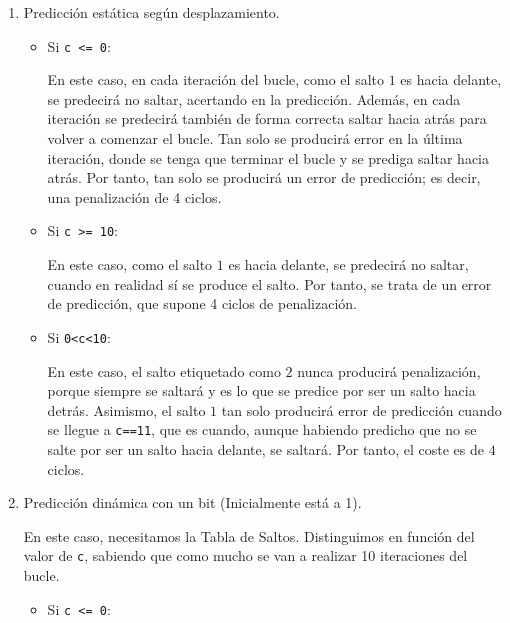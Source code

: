 \begin{ejercicio}
\begin{enumerate}
    \item Predicción estática según desplazamiento.
    
    \begin{itemize}
        \item Si \verb|c <= 0|:
        
        En este caso, en cada iteración del bucle, como el salto $1$ es hacia delante, se predecirá no saltar, acertando en la predicción.
        Además, en cada iteración se predecirá también de forma correcta saltar hacia atrás para volver a comenzar el bucle. Tan solo se producirá error
        en la última iteración, donde se tenga que terminar el bucle y se prediga saltar hacia atrás. Por tanto,
        tan solo se producirá un error de predicción; es decir, una penalización de 4 ciclos.

        \item Si \verb|c >= 10|:
        
        En este caso, como el salto $1$ es hacia delante, se predecirá no saltar, cuando en realidad sí se produce el salto. Por tanto,
        se trata de un error de predicción, que supone 4 ciclos de penalización.

        \item Si \verb|0<c<10|:
        
        En este caso, el salto etiquetado como $2$ nunca producirá penalización, porque siempre se saltará y es lo que se predice por ser un salto hacia detrás.
        Asimismo, el salto $1$ tan solo producirá error de predicción cuando se llegue a \verb|c==11|, que es cuando, aunque habiendo predicho que no se salte por ser un salto hacia delante,
        se saltará. Por tanto, el coste es de $4$ ciclos.
    \end{itemize}

    \item Predicción dinámica con un bit (Inicialmente está a 1).
    
    En este caso, necesitamos la Tabla de Saltos. Distinguimos en función del valor de \verb|c|, sabiendo que como mucho se van a realizar 10 iteraciones del bucle.
    \begin{itemize}
        \item Si \verb|c <= 0|:
        

\end{itemize}
\end{enumerate}
\end{ejercicio}
